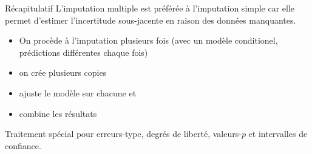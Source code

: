 \documentclass[
  ignorenonframetext,
]{beamer}
\providecommand{\tightlist}{%
  \setlength{\itemsep}{0pt}\setlength{\parskip}{0pt}}\usepackage{longtable,booktabs,array}
\begin{document}
\begin{frame}{Récapitulatif}
\label{ruxe9capitulatif-5}
L'imputation multiple est préférée à l'imputation simple car elle permet
d'estimer l'incertitude sous-jacente en raison des données manquantes.

\begin{itemize}
\tightlist
\item
  On procède à l'imputation plusieurs fois (avec un modèle conditionel,
  prédictions différentes chaque fois)
\item
  on crée plusieurs copies
\item
  ajuste le modèle sur chacune et
\item
  combine les résultats
\end{itemize}

Traitement spécial pour erreurs-type, degrés de liberté, valeurs-\(p\)
et intervalles de confiance.
\end{frame}
\end{document}

